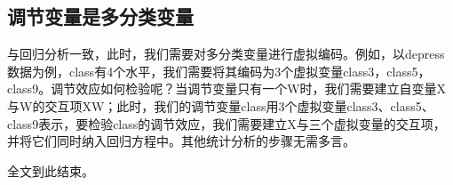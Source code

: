 \documentclass[
  chinese-hans,
  letterpaper,
  DIV=11,
  numbers=noendperiod]{scrartcl}
\begin{document}
\subsection{调节变量是多分类变量}\label{ux8c03ux8282ux53d8ux91cfux662fux591aux5206ux7c7bux53d8ux91cf}

与回归分析一致，此时，我们需要对多分类变量进行虚拟编码。例如，以depress数据为例，class有4个水平，我们需要将其编码为3个虚拟变量class3，class5，class9。调节效应如何检验呢？当调节变量只有一个W时，我们需要建立自变量X与W的交互项XW；此时，我们的调节变量class用3个虚拟变量class3、class5、class9表示，要检验class的调节效应，我们需要建立X与三个虚拟变量的交互项，并将它们同时纳入回归方程中。其他统计分析的步骤无需多言。

全文到此结束。
\end{document}
